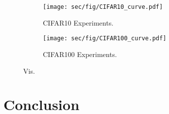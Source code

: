 \newpage
\null
\newpage
\null

\begin{figure*}
  \centering
  \begin{subfigure}{0.45\linewidth}
    \texttt{[image: sec/fig/CIFAR10\_curve.pdf]}   
    \caption{CIFAR10 Experiments.}
    \label{fig:cifar10 exp}
  \end{subfigure}
  \hfill
  \begin{subfigure}{0.45\linewidth}
    \texttt{[image: sec/fig/CIFAR100\_curve.pdf]}   
    \caption{CIFAR100 Experiments.}
    \label{fig:cifar100 exp}
  \end{subfigure}
  \caption{Vis.}
  \label{fig:vis}
\end{figure*}



\section{Conclusion}
\label{sec:conclusion}




